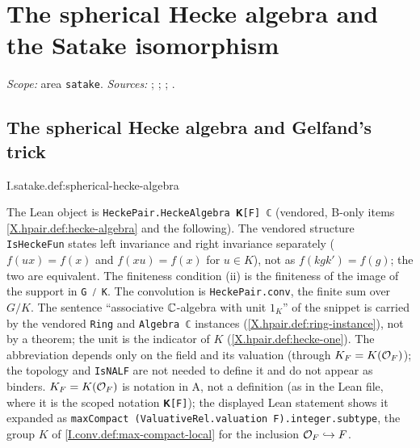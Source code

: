 \chapter{The spherical Hecke algebra and the Satake isomorphism}\label{ch:ch-1-01-spherical}

\noindent\emph{Scope:} area \texttt{satake}. \emph{Sources:} \cite{Sat}; \cite[§9, Proposition~37]{BumpH}; \cite[§9]{Cas-p}; \cite{Corv-ptI-7}.

\section{The spherical Hecke algebra and Gelfand's trick}
\begin{definition}
\end{definition}
\begin{tfformal}{I.satake.def:spherical-hecke-algebra}
\begin{tffidelity}
The Lean object is \texttt{HeckePair.HeckeAlgebra 𝐊[F] ℂ} (vendored, B-only items \cref{X.hpair.def:hecke-algebra} and the following). The vendored structure \texttt{IsHeckeFun} states left invariance and right invariance separately ($f(ux)=f(x)$ and $f(xu)=f(x)$ for $u\in K$), not as $f(kgk')=f(g)$; the two are equivalent. The finiteness condition (ii) is the finiteness of the image of the support in \texttt{G ⧸ K}. The convolution is \texttt{HeckePair.conv}, the finite sum over $G/K$. The sentence ``associative $\mathbb{C}$-algebra with unit $1_K$'' of the snippet is carried by the vendored \texttt{Ring} and \texttt{Algebra ℂ} instances (\cref{X.hpair.def:ring-instance}), not by a theorem; the unit is the indicator of $K$ (\cref{X.hpair.def:hecke-one}). The abbreviation depends only on the field and its valuation (through $K_F=K(\mathcal{O}_F)$); the topology and \texttt{IsNALF} are not needed to define it and do not appear as binders. $K_F=K(\mathcal{O}_F)$ is notation in A, not a definition (as in the Lean file, where it is the scoped notation \texttt{𝐊[F]}); the displayed Lean statement shows it expanded as \texttt{maxCompact (ValuativeRel.valuation F).integer.subtype}, the group $K$ of \cref{I.conv.def:max-compact-local} for the inclusion $\mathcal{O}_F\hookrightarrow F$.
\end{tffidelity}
\end{tfformal}

